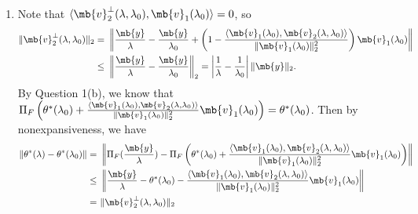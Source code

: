 \begin{exercise}
\begin{enumerate}
\begin{solution}
\begin{enumerate}
          \item Note that $\langle\mb{v}^\perp_2(\lambda,\lambda_0),\mb{v}_1(\lambda_0)\rangle = 0$, so
            \begin{align*}
              \|\mb{v}^\perp_2(\lambda,\lambda_0)\|_2 =\  & \left\|\frac{\mb{y}}{\lambda} - \frac{\mb{y}}{\lambda_0} + \left(1- \frac{\langle\mb{v}_1(\lambda_0), \mb{v}_2(\lambda,\lambda_0)\rangle}{\|\mb{v}_1(\lambda_0)\|^2_2}\right)\mb{v}_1(\lambda_0)\right\| \\
              \le\                                        & \left\|\frac{\mb{y}}{\lambda} - \frac{\mb{y}}{\lambda_0}\right\|_2 = \left|\frac{1}{\lambda} - \frac{1}{\lambda_0}\right|\|\mb{y}\|_2.
            \end{align*}
            By Question 1(b), we know that $\Pi_F\left(\theta^*(\lambda_0) + \frac{\langle\mb{v}_1(\lambda_0), \mb{v}_2(\lambda,\lambda_0)\rangle}{\|\mb{v}_1(\lambda_0)\|^2_2}\mb{v}_1(\lambda_0)\right) = \theta^*(\lambda_0)$. Then by nonexpansiveness, we have 
            \begin{align*}
              \|\theta^*(\lambda) - \theta^*(\lambda_0)\| = \  & \left\|\Pi_F(\frac{\mb{y}}{\lambda}) - \Pi_F\left(\theta^*(\lambda_0) + \frac{\langle\mb{v}_1(\lambda_0), \mb{v}_2(\lambda,\lambda_0)\rangle}{\|\mb{v}_1(\lambda_0)\|^2_2}\mb{v}_1(\lambda_0)\right)\right\| \\
              \le\                                             & \left\|\frac{\mb{y}}{\lambda} - \theta^*(\lambda_0) - \frac{\langle\mb{v}_1(\lambda_0), \mb{v}_2(\lambda,\lambda_0)\rangle}{\|\mb{v}_1(\lambda_0)\|^2_2}\mb{v}_1(\lambda_0)\right\|                          \\
              =\                                               & \| \mb{v}^\perp_2(\lambda,\lambda_0)\|_2
            \end{align*}
            \qedhere
        \end{enumerate}
      \end{solution}
      
  \end{enumerate}
  
\end{exercise}
\newpage









